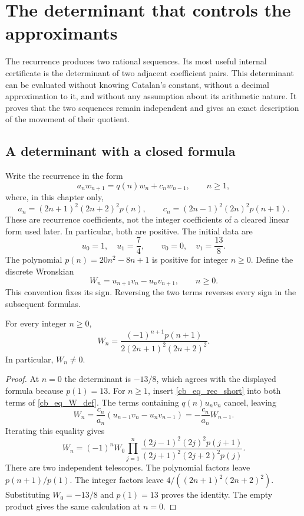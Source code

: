 \chapter{The determinant that controls the approximants}
\label{cb_ch_wronskian}

The recurrence produces two rational sequences. Its most useful internal
certificate is the determinant of two adjacent coefficient pairs. This
determinant can be evaluated without knowing Catalan's constant, without a
decimal approximation to it, and without any assumption about its arithmetic
nature. It proves that the two sequences remain independent and gives an
exact description of the movement of their quotient.

\section{A determinant with a closed formula}

Write the recurrence in the form
\begin{equation}\label{cb_eq_rec_short}
 a_n w_{n+1}=q(n)w_n+c_nw_{n-1},\qquad n\geq1,
\end{equation}
where, in this chapter only,
\[
 a_n=(2n+1)^2(2n+2)^2p(n),\qquad
 c_n=(2n-1)^2(2n)^2p(n+1).
\]
These are recurrence coefficients, not the integer coefficients of a cleared
linear form used later. In particular, both are positive. The initial data are
\[
 u_0=1,\quad u_1=\frac74,\qquad
 v_0=0,\quad v_1=\frac{13}{8}.
\]
The polynomial $p(n)=20n^2-8n+1$ is positive for integer $n\geq0$.
Define the discrete Wronskian
\begin{equation}\label{cb_eq_W_def}
 W_n=u_{n+1}v_n-u_nv_{n+1},\qquad n\geq0.
\end{equation}
This convention fixes its sign. Reversing the two terms reverses every sign
in the subsequent formulas.

\begin{theorem}\label{cb_thm_W}
For every integer $n\geq0$,
\begin{equation}\label{cb_eq_W_closed}
 W_n=\frac{(-1)^{n+1}p(n+1)}{2(2n+1)^2(2n+2)^2}.
\end{equation}
In particular, $W_n\ne0$.
\end{theorem}

\begin{proof}
At $n=0$ the determinant is $-13/8$, which agrees with the displayed
formula because $p(1)=13$. For $n\geq1$, insert
\eqref{cb_eq_rec_short} into both terms of \eqref{cb_eq_W_def}. The terms
containing $q(n)u_nv_n$ cancel, leaving
\[
 W_n=\frac{c_n}{a_n}(u_{n-1}v_n-u_nv_{n-1})
     =-\frac{c_n}{a_n}W_{n-1}.
\]
Iterating this equality gives
\[
 W_n=(-1)^nW_0
 \prod_{j=1}^n
 \frac{(2j-1)^2(2j)^2p(j+1)}{(2j+1)^2(2j+2)^2p(j)}.
\]
There are two independent telescopes. The polynomial factors leave
$p(n+1)/p(1)$. The integer factors leave
$4/((2n+1)^2(2n+2)^2)$. Substituting $W_0=-13/8$ and $p(1)=13$
proves the identity. The empty product gives the same calculation at $n=0$.
\end{proof}

